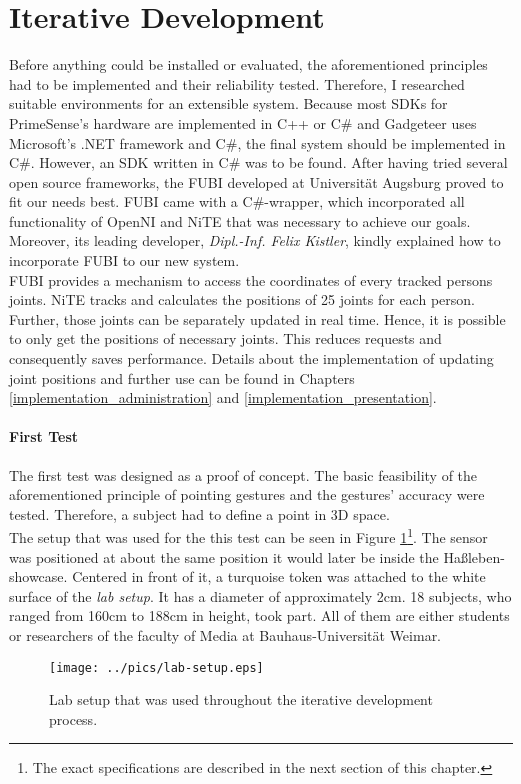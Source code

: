 
\section{Iterative Development}
\label{installation_testing}

Before anything could be installed or evaluated, the aforementioned principles had to be implemented and their reliability tested. Therefore, I researched suitable environments for an extensible system. Because most \ac{SDK}s for PrimeSense's hardware are implemented in C++ or C$\#$ and Gadgeteer uses Microsoft's .NET framework and C$\#$, the final system should be implemented in C$\#$. However, an \ac{SDK} written in C$\#$ was to be found. After having tried several open source frameworks, the \ac{FUBI} developed at Universität Augsburg proved to fit our needs best. \ac{FUBI} came with a C$\#$-wrapper, which incorporated all functionality of OpenNI and NiTE that was necessary to achieve our goals. Moreover, its leading developer, \textit{Dipl.-Inf. Felix Kistler}, kindly explained how to incorporate \ac{FUBI} to our new system. 
\\
\ac{FUBI} provides a mechanism to access the coordinates of every tracked persons joints. NiTE tracks and calculates the positions of 25 joints for each person. Further, those joints can be separately updated in real time. Hence, it is possible to only get the positions of necessary joints. This reduces requests and consequently saves performance. Details about the implementation of updating joint positions and further use can be found in Chapters \ref{implementation_administration} and \ref{implementation_presentation}.

\paragraph{First Test} The first test was designed as a proof of concept. The basic feasibility of the aforementioned principle of pointing gestures and the gestures' accuracy were tested. Therefore, a subject had to define a point in \ac{3D} space.
\\ 
The setup that was used for the this test can be seen in Figure \ref{fig:testing_1}\footnote{The exact specifications are described in the next section of this chapter.}. The sensor was positioned at about the same position it would later be inside the Haßleben-showcase. Centered in front of it, a turquoise token was attached to the white surface of the \textit{lab setup}. It has a diameter of approximately 2cm. 18 subjects, who ranged from 160cm to 188cm in height, took part. All of them are either students or researchers of the faculty of Media at Bauhaus-Universität Weimar.
\begin{figure}[H]%
\texttt{[image: ../pics/lab-setup.eps]}%
\caption{Lab setup that was used throughout the iterative development process.}%
\label{fig:testing_1}%
\end{figure}

